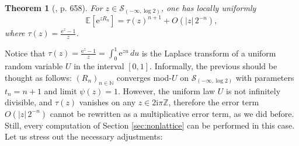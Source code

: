 \documentclass[12pt,a4paper,reqno]{amsart}
\newtheorem{theorem}[lemma]{Theorem}
\theoremstyle{remark}
\newcommand{\N}{\mathbb{N}}
\newcommand{\Z}{\mathbb{Z}}
\newcommand{\E}{\mathrm{e}}
\newcommand{\I}{\mathrm{i}}
\newcommand{\esper}{\mathbb{E}}
\begin{document}
\begin{theorem}[\cite{FSe09}, p. 658]\label{thm:flajoletrises}
For $z \in \mathcal{S}_{(-\infty,\log 2)}$, one has locally uniformly
$$\esper[\E^{zR_n}] = \tau(z)^{n+1} + O(|z|\,2^{-n}),$$
where $\tau(z) = \frac{\E^z-1}{z}$.
\end{theorem}
\noindent Notice that $\tau(z) = \frac{\E^z-1}{z} = \int_0^1 \E^{zu}\,du$ is the Laplace transform of a uniform random variable $U$ in the interval $[0,1]$. 
Informally, the previous should be thought as follows: $(R_n)_{n \in \N}$ converges mod-$U$ on $\mathcal{S}_{(-\infty,\log 2)}$ with parameters $t_n=n+1$ and limit $\psi(z)=1$.
However, the uniform law $U$ is not infinitely divisible, and $\tau(z)$ vanishes on any $z \in 2\I \pi\Z$,
therefore the error term $O(|z|\,2^{-n})$ cannot be rewritten as a multiplicative error term,
as we did before.
Still, every computation of Section \ref{sec:nonlattice} can be performed in this case. 
Let us stress out the necessary adjustments:
\end{document}
